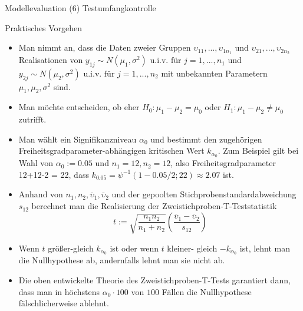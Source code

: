 \documentclass[
  8pt,
  ignorenonframetext,
]{beamer}
\begin{document}
\begin{frame}{Modellevaluation}
\protect\hypertarget{modellevaluation-32}{}
\noindent (6) Testumfangkontrolle

\small

Praktisches Vorgehen \footnotesize

\begin{itemize}
\itemsep1mm
\justifying

\item Man nimmt an, dass die Daten zweier Gruppen $\upsilon_{11},...,\upsilon_{1n_1}$
und $\upsilon_{21},...,\upsilon_{2n_2}$ Realisationen von
$y_{1j} \sim N(\mu_1,\sigma^2) \mbox{ u.i.v.  für } j = 1,...,n_1$ und
$y_{2j} \sim N(\mu_2,\sigma^2) \mbox{ u.i.v.  für } j = 1,...,n_2$
mit unbekannten Parametern $\mu_1,\mu_2,\sigma^2$ sind.

\item Man möchte entscheiden, ob eher $H_0 : \mu_1 - \mu_2 = \mu_0$ oder
$H_1: \mu_1 - \mu_2 \neq \mu_0$ zutrifft.

\item Man wählt ein Signifikanzniveau $\alpha_0$ und bestimmt den zugehörigen
Freiheitsgradparameter-abhängigen kritischen Wert $k_{\alpha_0}$. Zum Beispiel
gilt bei Wahl von $\alpha_0  := 0.05$ und $n_1=12, n_2 = 12$, also
Freiheitsgradparameter 12+12-2 = 22, dass $k_{0.05}=\psi^{-1}(1-0.05/2; 22)
\approx 2.07$ ist.

\item Anhand von $n_1,n_2,\bar{\upsilon}_1,\bar{\upsilon}_2$ und der gepoolten
Stichprobenstandardabweichung $s_{12}$ berechnet man die Realisierung der
Zweistichproben-T-Teststatistik
\begin{equation}
t := \sqrt{\frac{n_1n_2}{n_1+n_2}}\left(\frac{\bar{\upsilon}_1-\bar{\upsilon}_2}{s_{12}}\right)
\end{equation}

\item Wenn $t$ größer-gleich $k_{\alpha_0}$ ist oder wenn $t$ kleiner-
gleich $-k_{\alpha_0}$ ist, lehnt man die Nullhypothese ab, andernfalls lehnt
man sie nicht ab.

\item Die oben entwickelte Theorie des Zweistichproben-T-Tests garantiert dann,
dass man in höchstens $\alpha_0 \cdot 100$ von $100$ Fällen die Nullhypothese
fälschlicherweise ablehnt.
\end{itemize}
\end{frame}
\end{document}
